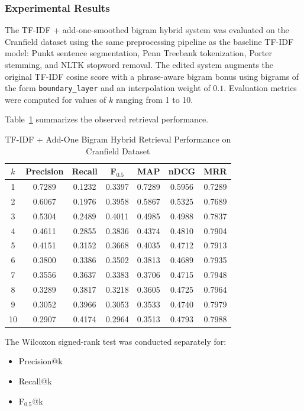 \subsubsection{Experimental Results}

The TF-IDF + add-one-smoothed bigram hybrid system was evaluated on the Cranfield dataset using the same preprocessing pipeline as the baseline TF-IDF model: Punkt sentence segmentation, Penn Treebank tokenization, Porter stemming, and NLTK stopword removal.
The edited system augments the original TF-IDF cosine score with a phrase-aware bigram bonus using bigrams of the form \texttt{boundary\_layer} and an interpolation weight of $0.1$.
Evaluation metrics were computed for values of $k$ ranging from 1 to 10.

Table~\ref{tab:bigram_add1_metrics} summarizes the observed retrieval performance.

\begin{table}[H]
\centering
\caption{TF-IDF + Add-One Bigram Hybrid Retrieval Performance on Cranfield Dataset}
\label{tab:bigram_add1_metrics}
\begin{tabular}{|c|c|c|c|c|c|c|}
\hline
$k$ & Precision & Recall & F$_{0.5}$ & MAP & nDCG & MRR \\
\hline
1  & 0.7289 & 0.1232 & 0.3397 & 0.7289 & 0.5956 & 0.7289 \\
2  & 0.6067 & 0.1976 & 0.3958 & 0.5867 & 0.5325 & 0.7689 \\
3  & 0.5304 & 0.2489 & 0.4011 & 0.4985 & 0.4988 & 0.7837 \\
4  & 0.4611 & 0.2855 & 0.3836 & 0.4374 & 0.4810 & 0.7904 \\
5  & 0.4151 & 0.3152 & 0.3668 & 0.4035 & 0.4712 & 0.7913 \\
6  & 0.3800 & 0.3386 & 0.3502 & 0.3813 & 0.4689 & 0.7935 \\
7  & 0.3556 & 0.3637 & 0.3383 & 0.3706 & 0.4715 & 0.7948 \\
8  & 0.3289 & 0.3817 & 0.3218 & 0.3605 & 0.4725 & 0.7964 \\
9  & 0.3052 & 0.3966 & 0.3053 & 0.3533 & 0.4740 & 0.7979 \\
10 & 0.2907 & 0.4174 & 0.2964 & 0.3513 & 0.4793 & 0.7988 \\
\hline
\end{tabular}
\end{table}

The Wilcoxon signed-rank test was conducted separately for:

\begin{itemize}
    \item Precision@k
    \item Recall@k
    \item F$_{0.5}$@k
\end{itemize}

